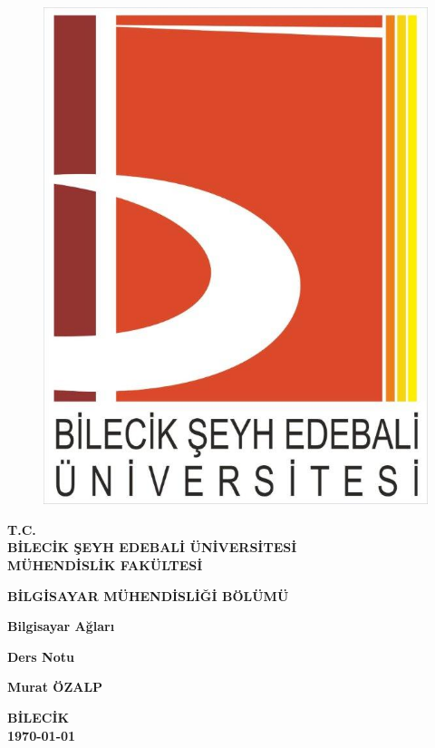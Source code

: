 \thispagestyle{empty} 
\begin{figure}[H]
\centering
\includegraphics[scale=0.2]{logomuz}
\end{figure}
\begin{center}
\textbf{T.C.}\\
\textbf{BİLECİK ŞEYH EDEBALİ ÜNİVERSİTESİ}\\
\textbf{MÜHENDİSLİK FAKÜLTESİ}

\textbf{BİLGİSAYAR MÜHENDİSLİĞİ BÖLÜMÜ}
\end{center}

\vspace*{4cm}
\begin{center}
\textbf{Bilgisayar Ağları}


\textbf{Ders Notu}
\end{center}

\vspace*{\fill}
\begin{center}
\textbf{Murat ÖZALP}

\textbf{BİLECİK}\\ 
\textbf{\today}
\end{center}
